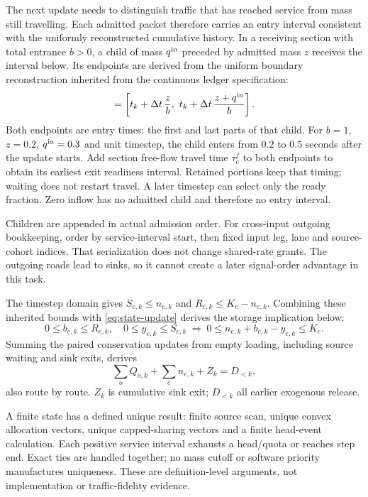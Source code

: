 \documentclass[10pt,a4paper]{article}
\begin{document}
The next update needs to distinguish traffic that has reached service
from mass still travelling. Each admitted packet therefore carries an
entry interval consistent with the uniformly reconstructed cumulative
history. In a receiving section with total entrance $b>0$, a child of
mass $q^{\rm in}$ preceded by admitted mass $z$ receives the interval below.
Its endpoints are derived from the uniform boundary reconstruction inherited from the continuous ledger specification:
\begin{equation}
 [t^{\rm in}_{\rm front},t^{\rm in}_{\rm tail}]
 =\left[t_k+\Delta t\,\frac z b,\
       t_k+\Delta t\,\frac{z+q^{\rm in}}b\right].
 \label{eq:entry-time}
\end{equation}
Both endpoints are entry times: the first and last parts of that child.
For $b=1$, $z=0.2$, $q^{\rm in}=0.3$ and unit timestep, the child enters
from $0.2$ to $0.5$ seconds after the update starts. Add section free-flow
travel time $\tau^f_e$ to both endpoints to obtain its earliest exit
readiness interval. Retained portions keep that timing; waiting does not
restart travel. A later timestep can select only the ready fraction.
Zero inflow has no admitted child and therefore no entry interval.

Children are appended in actual admission order. For cross-input
outgoing bookkeeping, order by service-interval start, then fixed input
leg, lane and source-cohort indices. That serialization does not change
shared-rate grants. The outgoing roads lead to sinks, so it cannot create
a later signal-order advantage in this task.
\par

The timestep domain gives $S_{e,k}\leq n_{e,k}$ and
$R_{e,k}\leq K_e-n_{e,k}$.
Combining these inherited bounds with \eqref{eq:state-update} derives the storage implication below:
\begin{equation}
 0\leq b_{e,k}\leq R_{e,k},\quad0\leq y_{e,k}\leq S_{e,k}
 \ \Longrightarrow\
 0\leq n_{e,k}+b_{e,k}-y_{e,k}\leq K_e .
 \label{eq:storage-bound}
\end{equation}
Summing the paired conservation updates from empty loading, including source waiting and sink exits, derives
\begin{equation}
 \sum_oQ_{o,k}+\sum_en_{e,k}+Z_k=D_{<k},
 \label{eq:mass-identity}
\end{equation}
also route by route. $Z_k$ is cumulative sink exit; $D_{<k}$ all earlier
exogenous release.

A finite state has a defined unique result: finite source scan, unique
convex allocation vectors, unique capped-sharing vectors and a finite
head-event calculation. Each positive service interval exhausts a
head/quota or reaches step end. Exact ties are handled together; no
mass cutoff or software priority manufactures uniqueness. These are
definition-level arguments, not implementation or traffic-fidelity evidence.
\end{document}
